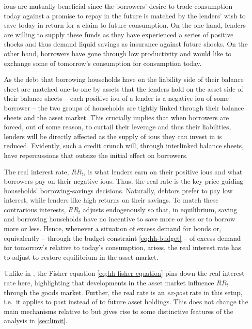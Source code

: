 \documentclass[a4paper,12pt]{article} %
\numberwithin{equation}{section} %
\numberwithin{figure}{section}
\numberwithin{table}{section}
\begin{document}
\Gls{iou}s are mutually beneficial since the borrowers' desire to trade consumption today against a promise to repay in the future is matched by the lenders' wish to save today in return for a claim to future consumption. On the one hand, lenders are willing to supply these funds as they have experienced a series of positive shocks and thus demand liquid savings as insurance against future shocks. On the other hand, borrowers have gone through low productivity and would like to exchange some of tomorrow's consumption for consumption today.

As the debt that borrowing households have on the liability side of their balance sheet are matched one-to-one by assets that the lenders hold on the asset side of their balance sheets -- each positive \Gls{iou} of a lender is a negative \Gls{iou} of some borrower -- the two groups of households are tightly linked through their balance sheets and the asset market. This crucially implies that when borrowers are forced, out of some reason, to curtail their leverage and thus their liabilities, lenders will be directly affected as the supply of \Gls{iou}s they can invest in is reduced. Evidently, such a credit crunch will, through interlinked balance sheets, have repercussions that outsize the initial effect on borrowers. %

The real interest rate, $RR_t$, is what lenders earn on their positive \Gls{iou}s and what borrowers pay on their negative \Gls{iou}s. Thus, the real rate is the key price guiding households' borrowing-savings decisions. Naturally, debtors prefer to pay low interest, while lenders like high returns on their savings. To match these contrarious interests, $RR_t$ adjusts endogenously so that, in equilibrium, saving and borrowing households have no incentive to save more or less or to borrow more or less. Hence, whenever a situation of excess demand for bonds or, equivalently -- through the budget constraint \eqref{eq:hh-budget} -- of excess demand for tomorrow's relative to today's consumption, arises, the real interest rate has to adjust to restore equilibrium in the asset market.

Unlike in \textcite{gl2017}, the Fisher equation \eqref{eq:hh-fisher-equation} pins down the real interest rate here, highlighting that developments in the asset market influence $RR_t$ through the goods market. Further, the real rate is an \textit{ex-post} rate in this setup, i.e.~it applies to past instead of to future asset holdings. This does not change the main mechanisms relative to \textcite{gl2017} but gives rise to some distinctive features of the analysis in \ref{sec:limit}.
\end{document}
